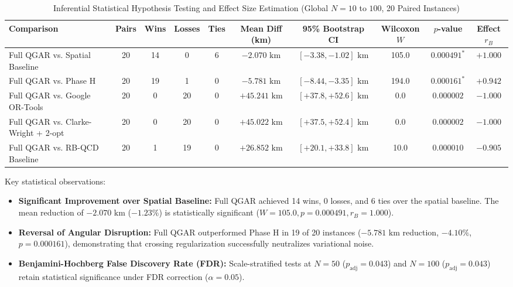 \documentclass[journal,10pt]{IEEEtran}
\begin{document}
\begin{table}[t]
\caption{Inferential Statistical Hypothesis Testing and Effect Size Estimation (Global $N=10$ to $100$, 20 Paired Instances)}
\label{tab:wilcoxon_tests}
\centering
\begin{tabular}{lccccccccc}
\toprule
\textbf{Comparison} & \textbf{Pairs} & \textbf{Wins} & \textbf{Losses} & \textbf{Ties} & \textbf{Mean Diff (km)} & \textbf{95\% Bootstrap CI} & \textbf{Wilcoxon $W$} & \textbf{$p$-value} & \textbf{Effect $r_B$} \\
\midrule
Full QGAR vs. Spatial Baseline & 20 & 14 & 0 & 6 & $-2.070\text{ km}$ & $[-3.38, -1.02]\text{ km}$ & 105.0 & $0.000491^*$ & $+1.000$ \\
Full QGAR vs. Phase H & 20 & 19 & 1 & 0 & $-5.781\text{ km}$ & $[-8.44, -3.35]\text{ km}$ & 194.0 & $0.000161^*$ & $+0.942$ \\
Full QGAR vs. Google OR-Tools & 20 & 0 & 20 & 0 & $+45.241\text{ km}$ & $[+37.8, +52.6]\text{ km}$ & 0.0 & $0.000002$ & $-1.000$ \\
Full QGAR vs. Clarke-Wright + 2-opt & 20 & 0 & 20 & 0 & $+45.022\text{ km}$ & $[+37.5, +52.4]\text{ km}$ & 0.0 & $0.000002$ & $-1.000$ \\
Full QGAR vs. RB-QCD Baseline & 20 & 1 & 19 & 0 & $+26.852\text{ km}$ & $[+20.1, +33.8]\text{ km}$ & 10.0 & $0.000010$ & $-0.905$ \\
\bottomrule
\end{tabular}
\end{table}

Key statistical observations:
\begin{itemize}
    \item \textbf{Significant Improvement over Spatial Baseline:} Full QGAR achieved 14 wins, 0 losses, and 6 ties over the spatial baseline. The mean reduction of $-2.070\text{ km}$ ($-1.23\%$) is statistically significant ($W = 105.0, p = 0.000491, r_B = 1.000$).
    \item \textbf{Reversal of Angular Disruption:} Full QGAR outperformed Phase H in 19 of 20 instances ($-5.781\text{ km}$ reduction, $-4.10\%$, $p = 0.000161$), demonstrating that crossing regularization successfully neutralizes variational noise.
    \item \textbf{Benjamini-Hochberg False Discovery Rate (FDR):} Scale-stratified tests at $N=50$ ($p_{\text{adj}} = 0.043$) and $N=100$ ($p_{\text{adj}} = 0.043$) retain statistical significance under FDR correction ($\alpha = 0.05$).
\end{itemize}
\end{document}
